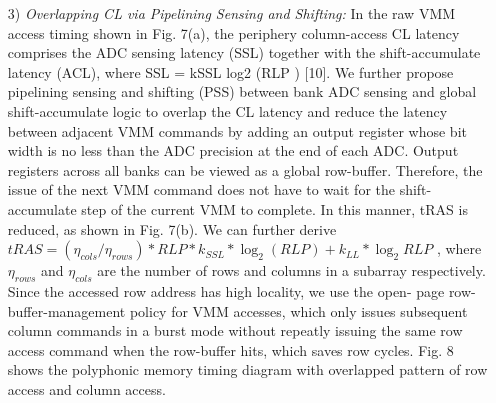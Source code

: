 \documentclass{article}
\begin{document}
\begin{enumerate}
 			\item[3)] \textit{Overlapping CL via Pipelining Sensing and Shifting:} In
 			the raw VMM access timing shown in Fig. 7(a), the periphery
 			column-access CL latency comprises the ADC sensing latency
 			(SSL) together with the shift-accumulate latency (ACL), where
 			SSL = kSSL log2 (RLP ) [10]. We further propose pipelining
 			sensing and shifting (PSS) between bank ADC sensing and
 			global shift-accumulate logic to overlap the CL latency and
 			reduce the latency between adjacent VMM commands by
 			adding an output register whose bit width is no less than the ADC precision at the end of each ADC. Output registers across
 			all banks can be viewed as a global row-buffer. Therefore, the
 			issue of the next VMM command does not have to wait for
 			the shift-accumulate step of the current VMM to complete.
 			In this manner, tRAS is reduced, as shown in Fig. 7(b). We
 			can further derive $tRAS = (\eta_{cols}/\eta_{rows}) * RLP * k_{SSL} * \log_2(RLP) + k_{LL}*\log_2RLP$ , where $\eta_{rows}$ and $\eta_{cols}$ are the
 			number of rows and columns in a subarray respectively. Since
 			the accessed row address has high locality, we use the open-
 			page row-buffer-management policy for VMM accesses, which
 			only issues subsequent column commands in a burst mode
 			without repeatly issuing the same row access command when
 			the row-buffer hits, which saves row cycles. Fig. 8 shows the
 			polyphonic memory timing diagram with overlapped pattern
 			of row access and column access.
 		\end{enumerate}
 	
\end{document}
